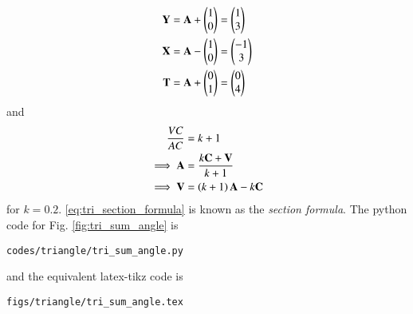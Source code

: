 \begin{enumerate}[label=\thesection.\arabic*.,ref=\thesection.\theenumi]
\begin{align}
\mathbf{Y} &= \mathbf{A} + \begin{pmatrix}1\\0\end{pmatrix} = \begin{pmatrix}1\\3\end{pmatrix}
\\
\mathbf{X} &= \mathbf{A} - \begin{pmatrix}1\\0\end{pmatrix} = \begin{pmatrix}-1\\3\end{pmatrix}
\\
\mathbf{T} &= \mathbf{A} + \begin{pmatrix}0\\1\end{pmatrix} = \begin{pmatrix}0\\4\end{pmatrix}
\end{align}
%
and 
\begin{align}
\frac{VC}{AC} &= k+1
\\
\label{eq:tri_section_formula}
\implies \vec{A} &= \frac{k\vec{C} + \vec{V}}{k+1}  
\\
\implies \vec{V} &= {\brak{k+1}\vec{A} - k\vec{C}}
\end{align}
%
for $k = 0.2$. \eqref{eq:tri_section_formula} is known as the {\em section formula}.
%
The python code for  Fig. \ref{fig:tri_sum_angle} is
\begin{lstlisting}
codes/triangle/tri_sum_angle.py
\end{lstlisting}
%
and the equivalent latex-tikz code is
%
\begin{lstlisting}
figs/triangle/tri_sum_angle.tex
\end{lstlisting}
\fi
\end{enumerate}
